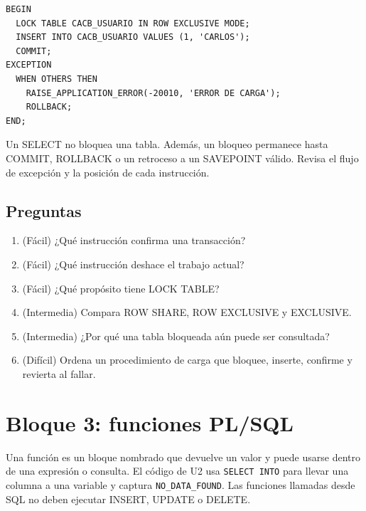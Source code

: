 \documentclass[11pt,a4paper]{article}
\newif\ifmostrarSoluciones
\newcommand{\campo}[1]{\texttt{#1}}
\begin{document}
\begin{lstlisting}
BEGIN
  LOCK TABLE CACB_USUARIO IN ROW EXCLUSIVE MODE;
  INSERT INTO CACB_USUARIO VALUES (1, 'CARLOS');
  COMMIT;
EXCEPTION
  WHEN OTHERS THEN
    RAISE_APPLICATION_ERROR(-20010, 'ERROR DE CARGA');
    ROLLBACK;
END;
\end{lstlisting}

\begin{errorbox}Un SELECT no bloquea una tabla. Además, un bloqueo permanece hasta COMMIT, ROLLBACK o un retroceso a un SAVEPOINT válido. Revisa el flujo de excepción y la posición de cada instrucción.\end{errorbox}
\subsection{Preguntas}
\begin{enumerate}[leftmargin=*]
\item (Fácil) ¿Qué instrucción confirma una transacción?
\item (Fácil) ¿Qué instrucción deshace el trabajo actual?
\item (Fácil) ¿Qué propósito tiene LOCK TABLE?
\item (Intermedia) Compara ROW SHARE, ROW EXCLUSIVE y EXCLUSIVE.
\item (Intermedia) ¿Por qué una tabla bloqueada aún puede ser consultada?
\item (Difícil) Ordena un procedimiento de carga que bloquee, inserte, confirme y revierta al fallar.
\end{enumerate}
\ifmostrarSoluciones\begin{clave}\textbf{Pauta breve:} COMMIT confirma y ROLLBACK deshace. El modo de bloqueo determina qué operaciones simultáneas se permiten. Las consultas no colocan bloqueo de tabla. Un flujo robusto pone LOCK antes del DML, COMMIT al terminar y ROLLBACK en el manejador de excepciones.\end{clave}\fi

\section{Bloque 3: funciones PL/SQL}
Una función es un bloque nombrado que devuelve un valor y puede usarse dentro de una expresión o
consulta. El código de U2 usa \campo{SELECT INTO} para llevar una columna a una variable y captura
\campo{NO\_DATA\_FOUND}. Las funciones llamadas desde SQL no deben ejecutar INSERT, UPDATE o DELETE.
\end{document}
